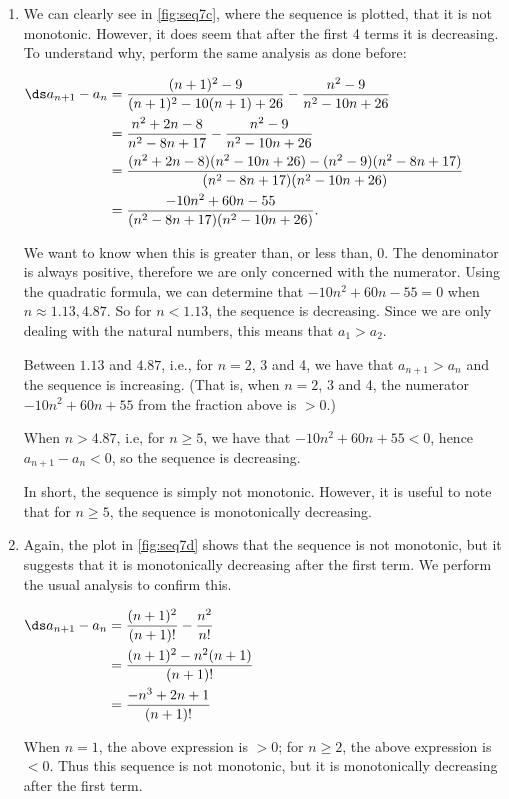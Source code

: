 {\begin{enumerate}
Since $a_{n+1}-a_n>0$ for all $n$, we conclude the sequence is increasing.

\item
{}
	We can clearly see in \autoref{fig:seq7c}, where the sequence is plotted, that it is not monotonic. However, it does seem that after the first 4 terms it is decreasing. To understand why, perform the same analysis as done before:

\hfill $\ds \begin{aligned}[t]	
	a_{n+1}-a_n &= \frac{(n+1)^2-9}{(n+1)^2-10(n+1)+26} - \frac{n^2-9}{n^2-10n+26} \\	
	&= \frac{n^2+2n-8}{n^2-8n+17}-\frac{n^2-9}{n^2-10n+26}\\
	&= \frac{(n^2+2n-8)(n^2-10n+26)-(n^2-9)(n^2-8n+17)}{(n^2-8n+17)(n^2-10n+26)}\\
	&= \frac{-10n^2+60n-55}{(n^2-8n+17)(n^2-10n+26)}.
\end{aligned}$\hfill \null		

We want to know when this is greater than, or less than, 0. The denominator is always positive, therefore we are only concerned with the numerator. Using the quadratic formula, we can determine that $-10n^2+60n-55=0$ when $n\approx 1.13, 4.87$. So for $n<1.13$, the sequence is decreasing. Since we are only dealing with the natural numbers, this means that $a_1 > a_2$.

Between $1.13$ and $4.87$, i.e., for $n=2$, 3 and 4, we have that $a_{n+1}>a_n$ and the sequence is increasing. (That is, when $n=2$, 3 and 4, the numerator $-10n^2+60n+55$ from the fraction above is $>0$.)

When $n> 4.87$, i.e, for $n\geq 5$, we have that $-10n^2+60n+55<0$, hence $a_{n+1}-a_n<0$, so the sequence is decreasing.

In short, the sequence is simply not monotonic. However, it is useful to note that for $n\geq 5$, the sequence is monotonically decreasing. 

\item
{}
	Again, the plot in \autoref{fig:seq7d} shows that the sequence is not monotonic, but it suggests that it is monotonically decreasing after the first term. We perform the usual analysis to confirm this.

\hfill $\ds \begin{aligned}[t]	
	a_{n+1}-a_n &= \frac{(n+1)^2}{(n+1)!} - \frac{n^2}{n!} \\
	&= \frac{(n+1)^2-n^2(n+1)}{(n+1)!} \\
	&=	\frac{-n^3+2n+1}{(n+1)!}
\end{aligned}$\hfill \null

When $n=1$, the above expression is $>0$; for $n\geq 2$, the above expression is $<0$. Thus this sequence is not monotonic, but it is monotonically decreasing after the first term.\eoehere
\end{enumerate}}

